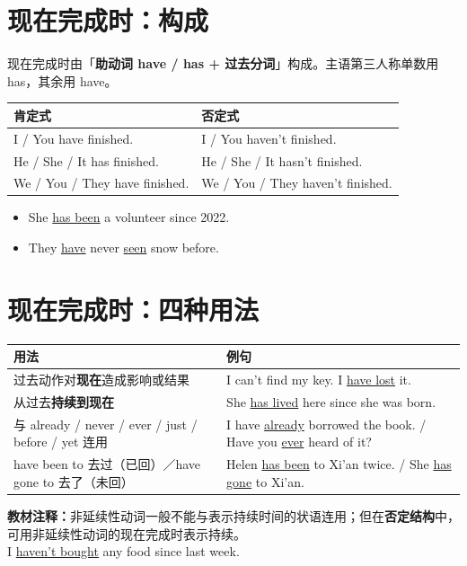 \documentclass[11pt,a4paper]{ctexart}
\begin{document}
\section{现在完成时：构成}
现在完成时由「\textbf{助动词 have / has + 过去分词}」构成。主语第三人称单数用 has，其余用 have。
\begin{center}
\begin{tabular}{p{6.4cm}p{6.4cm}}
\hline
\textbf{肯定式} & \textbf{否定式}\\
\hline
I / You have finished. & I / You haven't finished.\\
He / She / It has finished. & He / She / It hasn't finished.\\
We / You / They have finished. & We / You / They haven't finished.\\
\hline
\end{tabular}
\end{center}
\begin{itemize}[leftmargin=1.4em]
\item She \underline{has been} a volunteer since 2022.
\item They \underline{have} never \underline{seen} snow before.
\end{itemize}

\section{现在完成时：四种用法}
\begin{center}
\begin{tabular}{p{5.2cm}p{8.0cm}}
\hline
\textbf{用法} & \textbf{例句}\\
\hline
过去动作对\textbf{现在}造成影响或结果 & I can't find my key. I \underline{have lost} it.\\
从过去\textbf{持续到现在} & She \underline{has lived} here since she was born.\\
与 already / never / ever / just / before / yet 连用 & I have \underline{already} borrowed the book. / Have you \underline{ever} heard of it?\\
have been to 去过（已回）／have gone to 去了（未回） & Helen \underline{has been} to Xi'an twice. / She \underline{has gone} to Xi'an.\\
\hline
\end{tabular}
\end{center}
\textbf{教材注释：}非延续性动词一般不能与表示持续时间的状语连用；但在\textbf{否定结构}中，可用非延续性动词的现在完成时表示持续。\\
\quad I \underline{haven't bought} any food since last week.
\end{document}
